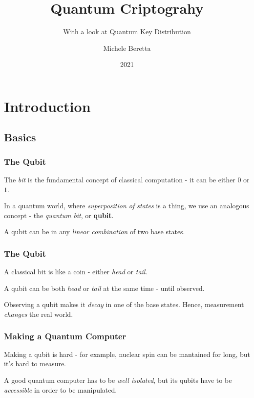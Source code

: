 \documentclass{beamer}
\title{Quantum Criptograhy}
\subtitle{With a look at Quantum Key Distribution}
\author{Michele Beretta}
\institute{UniBG
  \\ \url{https://github.com/micheleberetta98/qkd-presentation}
}
\date{2021}
\begin{document}
  \frame{\titlepage}


  \section{Introduction}
  \subsection{Basics}
  \begin{frame}
    \frametitle{The Qubit}
    The \textit{bit} is the fundamental concept of classical computation - it can be either $0$ or $1$.

    In a quantum world, where \textit{superposition of states} is a thing, we use an analogous concept -
    the \textit{quantum bit}, or \textbf{qubit}.

    A qubit can be in any \textit{linear combination} of two base states.
  \end{frame}
  \begin{frame}
    \frametitle{The Qubit}
    A classical bit is like a coin - either \textit{head} or \textit{tail}.

    A qubit can be both \textit{head} or \textit{tail} at the same time - until observed.

    Observing a qubit makes it \textit{decay} in one of the base states. Hence, measurement
    \textit{changes} the real world.
  \end{frame}
  \begin{frame}
    \frametitle{Making a Quantum Computer}
    Making a qubit is hard - for example, nuclear spin can be mantained for long, but it's hard to measure.

    A good quantum computer has to be \textit{well isolated}, but its qubits have to be \textit{accessible}
    in order to be manipulated.
  \end{frame}
  
\end{document}
